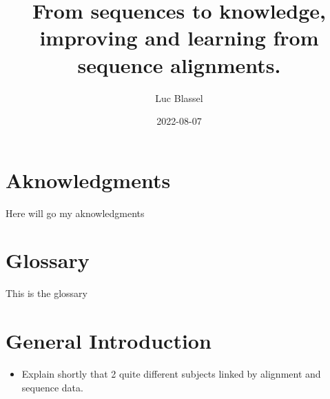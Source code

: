 \documentclass[
  11pt,
  twoside]{scrbook}
\title{From sequences to knowledge, improving and learning from sequence alignments.}
\author{Luc Blassel}
\date{2022-08-07}
\providecommand{\tightlist}{%
  \setlength{\itemsep}{0pt}\setlength{\parskip}{0pt}}
\begin{document}
\maketitle




\pagestyle{empty}
\frontmatter

\chapter{Aknowledgments}
Here will go my aknowledgments
\lipsum[7-9]

\chapter{Glossary}
This is the glossary

\mainmatter

{
\setcounter{tocdepth}{1}
\tableofcontents
}
\listoffigures
\listoftables
\pagestyle{empty}

\pagestyle{fancy}
\fancyhf{}
\fancyhead[RO]{\rightmark}
\fancyfoot[CO,CE]{\thepage}

\hypertarget{general-introduction}{%
\chapter*{General Introduction}\label{general-introduction}}

\begin{itemize}
\tightlist
\item
  Explain shortly that 2 quite different subjects linked by alignment and sequence data.
\end{itemize}
\end{document}
